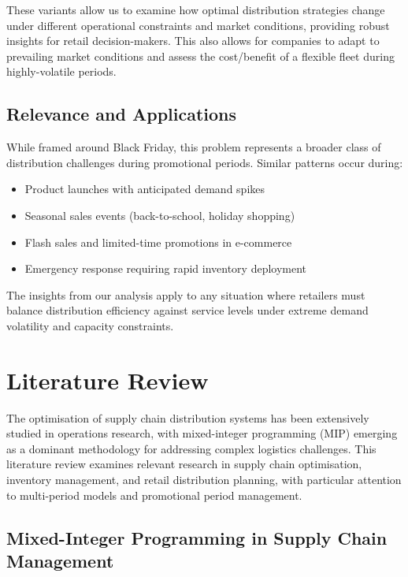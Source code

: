 \documentclass[a4paper,12pt]{article}
\begin{document}
These variants allow us to examine how optimal distribution strategies change under different operational constraints and market conditions, providing robust insights for retail decision-makers.
This also allows for companies to adapt to prevailing market conditions and assess the cost/benefit of a flexible fleet during highly-volatile periods.

\subsection{Relevance and Applications}\label{subsec:relevance-and-applications}

While framed around Black Friday, this problem represents a broader class of distribution challenges during promotional periods.
Similar patterns occur during:
\begin{itemize}
    \item Product launches with anticipated demand spikes
    \item Seasonal sales events (back-to-school, holiday shopping)
    \item Flash sales and limited-time promotions in e-commerce
    \item Emergency response requiring rapid inventory deployment
\end{itemize}

The insights from our analysis apply to any situation where retailers must balance distribution efficiency against service levels under extreme demand volatility and capacity constraints.







\section{Literature Review}\label{sec:literature-review}

The optimisation of supply chain distribution systems has been extensively studied in operations research, with mixed-integer programming (MIP) emerging as a dominant methodology for addressing complex logistics challenges.
This literature review examines relevant research in supply chain optimisation, inventory management, and retail distribution planning, with particular attention to multi-period models and promotional period management.

\subsection{Mixed-Integer Programming in Supply Chain Management}\label{subsec:mixed-integer-programming-in-supply-chain-management}
\end{document}
